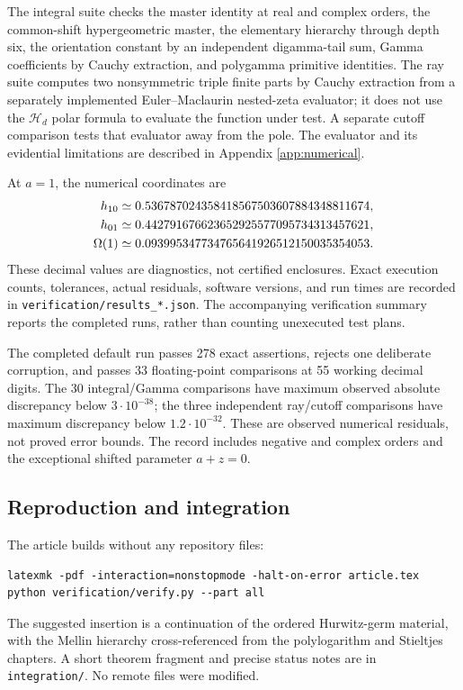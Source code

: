 \documentclass[11pt,a4paper]{article}
\numberwithin{equation}{section}
\theoremstyle{definition}\newtheorem{definition}[theorem]{Definition}
\theoremstyle{remark}\newtheorem{remark}[theorem]{Remark}
\newcommand{\HH}{\mathcal H}
\newcommand{\src}[1]{{\small\nolinkurl{#1}}}
\begin{document}
The integral suite checks the master identity at real and complex orders,
the common-shift hypergeometric master, the elementary hierarchy through
depth six, the orientation constant by an independent digamma-tail sum,
Gamma coefficients by Cauchy extraction, and polygamma primitive
identities. The ray suite computes two nonsymmetric triple finite parts
by Cauchy extraction from a separately implemented Euler--Maclaurin
nested-zeta evaluator; it does not use the $\HH_d$ polar formula to
evaluate the function under test. A separate cutoff comparison tests
that evaluator away from the pole. The evaluator and its evidential
limitations are described in Appendix \ref{app:numerical}.

At $a=1$, the numerical coordinates are
\begin{align}
 h_{10}&\simeq0.536787024358418567503607884348811674,\notag\\
 h_{01}&\simeq0.442791676623652925577095734313457621,\label{eq:numbers}\\
 \Omega(1)&\simeq0.093995347734765641926512150035354053.\notag
\end{align}
These decimal values are diagnostics, not certified enclosures. Exact
execution counts, tolerances, actual residuals, software versions, and
run times are recorded in \src{verification/results_*.json}. The
accompanying verification summary reports the completed runs, rather
than counting unexecuted test plans.

The completed default run passes 278 exact assertions, rejects one
deliberate corruption, and passes 33 floating-point comparisons at
55 working decimal digits. The 30 integral/Gamma comparisons have maximum
observed absolute discrepancy below $3\cdot10^{-38}$; the three
independent ray/cutoff comparisons have maximum discrepancy below
$1.2\cdot10^{-32}$. These are observed numerical residuals, not proved
error bounds. The record includes negative and complex orders and the
exceptional shifted parameter $a+z=0$.

\subsection{Reproduction and integration}
The article builds without any repository files:
\begin{verbatim}
latexmk -pdf -interaction=nonstopmode -halt-on-error article.tex
python verification/verify.py --part all
\end{verbatim}
The suggested insertion is a continuation of the ordered Hurwitz-germ
material, with the Mellin hierarchy cross-referenced from the
polylogarithm and Stieltjes chapters. A short theorem fragment and precise
status notes are in \src{integration/}. No remote files were modified.
\end{document}
